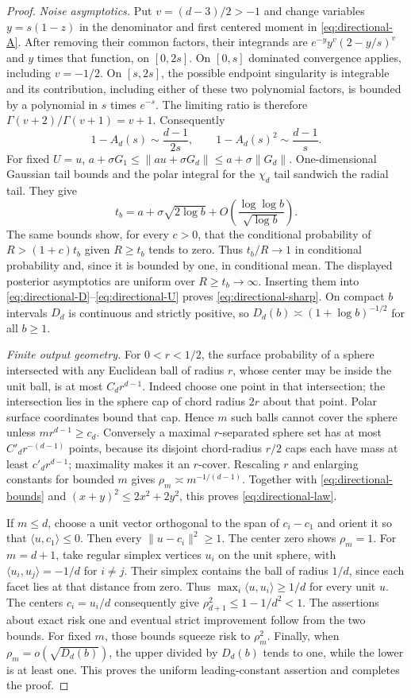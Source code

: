 \begin{proof}
\emph{Noise asymptotics.}
Put $v=(d-3)/2>-1$ and change variables $y=s(1-z)$ in the denominator and first centered moment in \eqref{eq:directional-A}. After removing their common factors, their integrands are $e^{-y}y^v(2-y/s)^v$ and $y$ times that function, on $[0,2s]$. On $[0,s]$ dominated convergence applies, including $v=-1/2$. On $[s,2s]$, the possible endpoint singularity is integrable and its contribution, including either of these two polynomial factors, is bounded by a polynomial in $s$ times $e^{-s}$. The limiting ratio is therefore $\Gamma(v+2)/\Gamma(v+1)=v+1$. Consequently
\[
 1-A_d(s)\sim\frac{d-1}{2s},\qquad
 1-A_d(s)^2\sim\frac{d-1}{s}.
\]
For fixed $U=u$, $a+\sigma G_1\le\|au+\sigma G_d\|\le a+\sigma\|G_d\|$. One-dimensional Gaussian tail bounds and the polar integral for the $\chi_d$ tail sandwich the radial tail. They give
\[
 t_b=a+\sigma\sqrt{2\log b}
       +O\left(\frac{\log\log b}{\sqrt{\log b}}\right).
\]
The same bounds show, for every $c>0$, that the conditional probability of $R>(1+c)t_b$ given $R\ge t_b$ tends to zero. Thus $t_b/R\to1$ in conditional probability and, since it is bounded by one, in conditional mean. The displayed posterior asymptotics are uniform over $R\ge t_b\to\infty$. Inserting them into \eqref{eq:directional-D}--\eqref{eq:directional-U} proves \eqref{eq:directional-sharp}. On compact $b$ intervals $D_d$ is continuous and strictly positive, so $D_d(b)\asymp(1+\log b)^{-1/2}$ for all $b\ge1$.

\emph{Finite output geometry.}
For $0<r<1/2$, the surface probability of a sphere intersected with any Euclidean ball of radius $r$, whose center may be inside the unit ball, is at most $C_dr^{d-1}$. Indeed choose one point in that intersection; the intersection lies in the sphere cap of chord radius $2r$ about that point. Polar surface coordinates bound that cap. Hence $m$ such balls cannot cover the sphere unless $mr^{d-1}\ge c_d$. Conversely a maximal $r$-separated sphere set has at most $C'_dr^{-(d-1)}$ points, because its disjoint chord-radius $r/2$ caps each have mass at least $c'_dr^{d-1}$; maximality makes it an $r$-cover. Rescaling $r$ and enlarging constants for bounded $m$ gives $\rho_m\asymp m^{-1/(d-1)}$. Together with \eqref{eq:directional-bounds} and $(x+y)^2\le2x^2+2y^2$, this proves \eqref{eq:directional-law}.

If $m\le d$, choose a unit vector orthogonal to the span of $c_i-c_1$ and orient it so that $\langle u,c_1\rangle\le0$. Then every $\|u-c_i\|^2\ge1$. The center zero shows $\rho_m=1$. For $m=d+1$, take regular simplex vertices $u_i$ on the unit sphere, with $\langle u_i,u_j\rangle=-1/d$ for $i\ne j$. Their simplex contains the ball of radius $1/d$, since each facet lies at that distance from zero. Thus $\max_i\langle u,u_i\rangle\ge1/d$ for every unit $u$. The centers $c_i=u_i/d$ consequently give $\rho_{d+1}^2\le1-1/d^2<1$. The assertions about exact risk one and eventual strict improvement follow from the two bounds. For fixed $m$, those bounds squeeze risk to $\rho_m^2$. Finally, when $\rho_m=o(\sqrt{D_d(b)})$, the upper divided by $D_d(b)$ tends to one, while the lower is at least one. This proves the uniform leading-constant assertion and completes the proof.
\end{proof}

